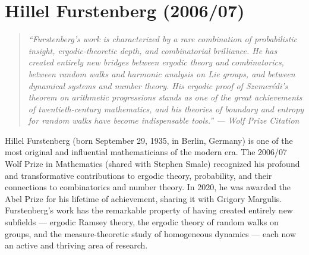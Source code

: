 \let\R\relax
\newcommand{\R}{\mathbb{R}}
\let\C\relax
\newcommand{\C}{\mathbb{C}}
\let\N\relax
\newcommand{\N}{\mathbb{N}}
\let\Z\relax
\newcommand{\Z}{\mathbb{Z}}
\let\Q\relax
\newcommand{\Q}{\mathbb{Q}}
\let\T\relax
\newcommand{\T}{\mathbb{T}}
\let\CP\relax
\newcommand{\CP}{\mathbb{CP}}
\let\SO\relax
\newcommand{\SO}{\operatorname{SO}}
\let\SL\relax
\newcommand{\SL}{\operatorname{SL}}
\let\GL\relax
\newcommand{\GL}{\operatorname{GL}}
\let\St\relax
\newcommand{\St}{\operatorname{St}}
\let\GV\relax
\newcommand{\GV}{\operatorname{GV}}
\let\E\relax
\newcommand{\E}{\operatorname{E}}
\let\Ent\relax
\newcommand{\Ent}{\operatorname{Ent}}
\let\Var\relax
\newcommand{\Var}{\operatorname{Var}}
\let\Cov\relax
\newcommand{\Cov}{\operatorname{Cov}}
\let\Prob\relax
\newcommand{\Prob}{\operatorname{Prob}}
\let\supp\relax
\newcommand{\supp}{\operatorname{supp}}
\let\Hom\relax
\newcommand{\Hom}{\operatorname{Hom}}
\let\Aut\relax
\newcommand{\Aut}{\operatorname{Aut}}
\let\End\relax
\newcommand{\End}{\operatorname{End}}
\let\Orb\relax
\newcommand{\Orb}{\operatorname{Orb}}
\let\Stab\relax
\newcommand{\Stab}{\operatorname{Stab}}
\let\Leb\relax
\newcommand{\Leb}{\operatorname{Leb}}
\let\id\relax
\newcommand{\id}{\operatorname{id}}
\let\conv\relax
\newcommand{\conv}{\operatorname{conv}}
\let\dist\relax
\newcommand{\dist}{\operatorname{dist}}
\let\Ces\relax
\newcommand{\Ces}{\operatorname{Ces}}

\chapter{Hillel Furstenberg (2006/07)}

\begin{quote}
\it ``Furstenberg's work is characterized by a rare combination of probabilistic insight, ergodic-theoretic depth, and combinatorial brilliance. He has created entirely new bridges between ergodic theory and combinatorics, between random walks and harmonic analysis on Lie groups, and between dynamical systems and number theory. His ergodic proof of Szemer\'edi's theorem on arithmetic progressions stands as one of the great achievements of twentieth-century mathematics, and his theories of boundary and entropy for random walks have become indispensable tools.'' --- Wolf Prize Citation
\end{quote}

Hillel Furstenberg (born September 29, 1935, in Berlin, Germany) is one of the most original and influential mathematicians of the modern era. The 2006/07 Wolf Prize in Mathematics (shared with Stephen Smale) recognized his profound and transformative contributions to ergodic theory, probability, and their connections to combinatorics and number theory. In 2020, he was awarded the Abel Prize for his lifetime of achievement, sharing it with Grigory Margulis. Furstenberg's work has the remarkable property of having created entirely new subfields --- ergodic Ramsey theory, the ergodic theory of random walks on groups, and the measure-theoretic study of homogeneous dynamics --- each now an active and thriving area of research.


